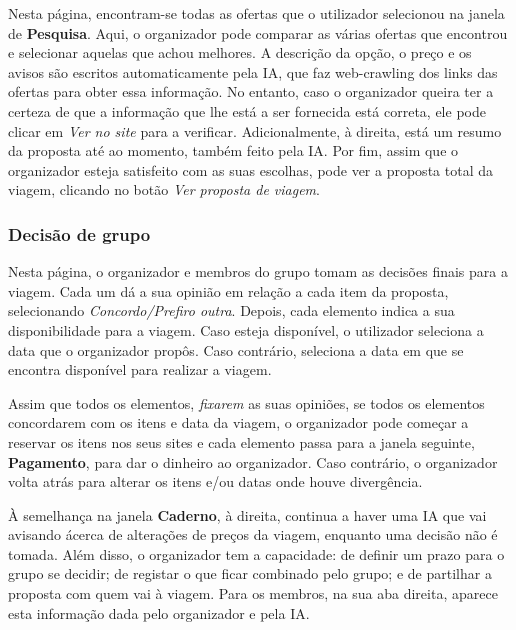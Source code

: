 Nesta página, encontram-se todas as ofertas que o utilizador selecionou na janela de \textbf{Pesquisa}.
Aqui, o organizador pode comparar as várias ofertas que encontrou e selecionar aquelas que achou melhores.
A descrição da opção, o preço e os avisos são escritos automaticamente pela IA, que faz web-crawling dos links das ofertas para obter essa informação.
No entanto, caso o organizador queira ter a certeza de que a informação que lhe está a ser fornecida está correta, ele pode clicar em \textit{Ver no site} para a verificar.
Adicionalmente, à direita, está um resumo da proposta até ao momento, também feito pela IA.
Por fim, assim que o organizador esteja satisfeito com as suas escolhas, pode ver a proposta total da viagem, clicando no botão \textit{Ver proposta de viagem}.

\subsubsection{Decisão de grupo}

Nesta página, o organizador e membros do grupo tomam as decisões finais para a viagem.
Cada um dá a sua opinião em relação a cada item da proposta, selecionando \textit{Concordo/Prefiro outra}.
Depois, cada elemento indica a sua disponibilidade para a viagem.
Caso esteja disponível, o utilizador seleciona a data que o organizador propôs.
Caso contrário, seleciona a data em que se encontra disponível para realizar a viagem.

Assim que todos os elementos, \textit{fixarem} as suas opiniões, se todos os elementos concordarem com os itens e data da viagem, o organizador pode começar a reservar os itens nos seus sites e cada elemento passa para a janela seguinte, \textbf{Pagamento}, para dar o dinheiro ao organizador.
Caso contrário, o organizador volta atrás para alterar os itens e/ou datas onde houve divergência.

À semelhança na janela \textbf{Caderno}, à direita, continua a haver uma IA que vai avisando ácerca de alterações de preços da viagem, enquanto uma decisão não é tomada.
Além disso, o organizador tem a capacidade: de definir um prazo para o grupo se decidir; de registar o que ficar combinado pelo grupo; e de partilhar a proposta com quem vai à viagem.
Para os membros, na sua aba direita, aparece esta informação dada pelo organizador e pela IA.

